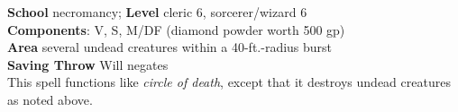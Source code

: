 \textbf{School} necromancy; \textbf{Level} cleric 6, sorcerer/wizard 6\\
\textbf{Components}: V, S, M/DF (diamond powder worth 500 gp)\\
\textbf{Area} several undead creatures within a 40-ft.-radius burst\\
\textbf{Saving Throw }Will negates\\
This spell functions like \textit{circle of death}, except that it destroys undead creatures as noted above.\\
